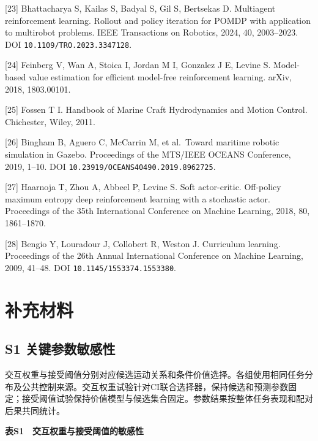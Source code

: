 \documentclass[
  11pt,
  fontset=none]{ctexart}
\begin{document}
{[}23{]} Bhattacharya S, Kailas S, Badyal S, Gil S, Bertsekas D.
Multiagent reinforcement learning. Rollout and policy iteration for
POMDP with application to multirobot problems. IEEE Transactions on
Robotics, 2024, 40, 2003--2023. DOI
\nolinkurl{10.1109/TRO.2023.3347128}.

{[}24{]} Feinberg V, Wan A, Stoica I, Jordan M I, Gonzalez J E, Levine
S. Model-based value estimation for efficient model-free reinforcement
learning. arXiv, 2018, 1803.00101.

{[}25{]} Fossen T I. Handbook of Marine Craft Hydrodynamics and Motion
Control. Chichester, Wiley, 2011.

{[}26{]} Bingham B, Aguero C, McCarrin M, et al.~Toward maritime robotic
simulation in Gazebo. Proceedings of the MTS/IEEE OCEANS Conference,
2019, 1--10. DOI \nolinkurl{10.23919/OCEANS40490.2019.8962725}.

{[}27{]} Haarnoja T, Zhou A, Abbeel P, Levine S. Soft actor-critic.
Off-policy maximum entropy deep reinforcement learning with a stochastic
actor. Proceedings of the 35th International Conference on Machine
Learning, 2018, 80, 1861--1870.

{[}28{]} Bengio Y, Louradour J, Collobert R, Weston J. Curriculum
learning. Proceedings of the 26th Annual International Conference on
Machine Learning, 2009, 41--48. DOI \nolinkurl{10.1145/1553374.1553380}.

\endgroup

\newpage

\section{补充材料}\label{ux8865ux5145ux6750ux6599}

\subsection{S1
关键参数敏感性}\label{s1-ux5173ux952eux53c2ux6570ux654fux611fux6027}

交互权重与接受阈值分别对应候选运动关系和条件价值选择。各组使用相同任务分布及公共控制来源。交互权重试验针对CI联合选择器，保持候选和预测参数固定；接受阈值试验保持价值模型与候选集合固定。参数结果按整体任务表现和配对后果共同统计。

\textbf{表S1　交互权重与接受阈值的敏感性}
\end{document}
